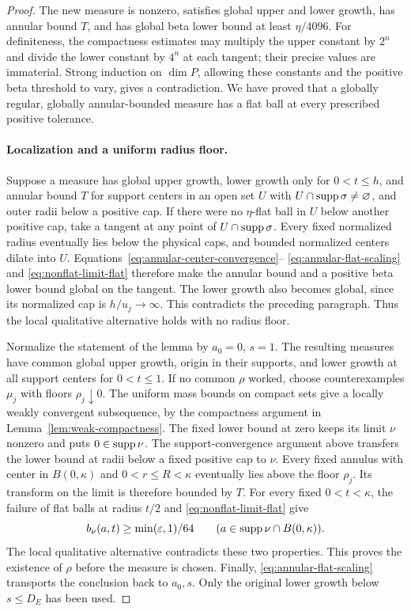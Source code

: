 \begin{proof}
The new measure is nonzero, satisfies global upper and lower
growth, has annular bound $T$, and has global beta lower bound
at least $\eta/4096$.  For definiteness, the compactness
estimates may multiply the upper constant by $2^n$ and divide
the lower constant by $4^n$ at each tangent; their precise
values are immaterial.  Strong induction on $\dim P$, allowing
these constants and the positive beta threshold to vary, gives
a contradiction.  We have proved that a globally regular,
globally annular-bounded measure has a flat ball at every
prescribed positive tolerance.

\paragraph{Localization and a uniform radius floor.}
Suppose a measure has global upper growth, lower growth only
for $0<t\leq h$, and annular bound $T$ for support centers in
an open set $U$ with $U\cap\operatorname{supp}\sigma\ne\varnothing$,
and outer radii below a positive cap.
If there were no $\eta$-flat ball in $U$ below another positive
cap, take a tangent at any point of $U\cap\operatorname{supp}\sigma$.
Every fixed normalized radius eventually lies below the physical
caps, and bounded normalized centers dilate into $U$.
Equations~\eqref{eq:annular-center-convergence}--
\eqref{eq:annular-flat-scaling} and
\eqref{eq:nonflat-limit-flat} therefore make the annular bound
and a positive beta lower bound global on the tangent.
The lower growth also becomes global, since its normalized cap
is $h/u_j\to\infty$.  This contradicts the preceding paragraph.
Thus the local qualitative alternative holds with no radius floor.

Normalize the statement of the lemma by $a_0=0$, $s=1$.
The resulting measures have common global upper growth, origin
in their supports, and lower growth at all support centers for
$0<t\leq1$.  If no common $\rho$ worked, choose counterexamples
$\mu_j$ with floors $\rho_j\downarrow0$.
The uniform mass bounds on compact sets give a locally weakly
convergent subsequence, by the compactness argument in
Lemma~\ref{lem:weak-compactness}.  The fixed lower bound at zero
keeps its limit $\nu$ nonzero and puts $0\in\operatorname{supp}\nu$.
The support-convergence argument above transfers the lower bound
at radii below a fixed positive cap to $\nu$.  Every fixed annulus with center in $B(0,\kappa)$ and
$0<r\leq R<\kappa$ eventually lies above the floor $\rho_j$.
Its transform on the limit is therefore bounded by $T$.
For every fixed $0<t<\kappa$, the failure of flat balls at
radius $t/2$ and \eqref{eq:nonflat-limit-flat} give
\[
 b_\nu(a,t)\geq\min(\varepsilon,1)/64
 \qquad(a\in\operatorname{supp}\nu\cap B(0,\kappa)).
\]
The local qualitative alternative contradicts these two
properties.  This proves the existence of $\rho$ before the
measure is chosen.  Finally,
\eqref{eq:annular-flat-scaling} transports the conclusion back
to $a_0,s$.  Only the original lower growth below $s\leq D_E$
has been used.
\end{proof}

